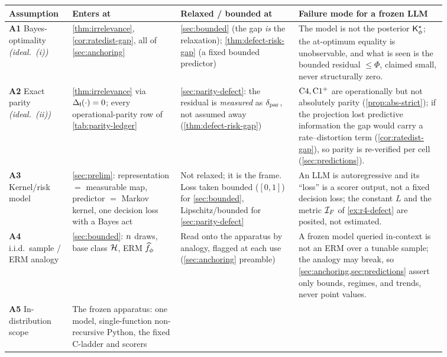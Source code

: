\begin{table}[t]
\centering
\small
\renewcommand{\arraystretch}{1.25}
\begin{tabular}{@{}>{\raggedright\arraybackslash}p{0.10\linewidth}>{\raggedright\arraybackslash}p{0.22\linewidth}>{\raggedright\arraybackslash}p{0.24\linewidth}>{\raggedright\arraybackslash}p{0.30\linewidth}@{}}
\toprule
Assumption & Enters at & Relaxed / bounded at & Failure mode for a frozen LLM \\
\midrule
\textbf{A1} Bayes-optimality \emph{(ideal.~(i))} &
  \cref{thm:irrelevance}, \cref{cor:ratedist-gap}, all of \cref{sec:anchoring} &
  \cref{sec:bounded} (the gap \emph{is} the relaxation); \cref{thm:defect-risk-gap} (a fixed bounded predictor) &
  The model is not the posterior $\mathsf{K}^{\star}_{\phi}$; the at-optimum equality is unobservable, and what is seen is the bounded residual $\le\Phi$, claimed small, never structurally zero. \\
\textbf{A2} Exact parity \emph{(ideal.~(ii))} &
  \cref{thm:irrelevance} via $\Delta_{\mathsf{I}}\!\left(\cdot\right)=0$; every operational-parity row of \cref{tab:parity-ledger} &
  \cref{sec:parity-defect}: the residual is \emph{measured} as $\delta_{\mathrm{par}}$, not assumed away (\cref{thm:defect-risk-gap}) &
  $\mathrm{C}4,\mathrm{C1^{+}}$ are operationally but not absolutely parity (\cref{prop:abs-strict}); if the projection lost predictive information the gap would carry a rate--distortion term (\cref{cor:ratedist-gap}), so parity is re-verified per cell (\cref{sec:predictions}). \\
\textbf{A3} Kernel/risk model &
  \cref{sec:prelim}: representation $=$ measurable map, predictor $=$ Markov kernel, one decision loss with a Bayes act &
  Not relaxed; it is the frame. Loss taken bounded ($[0,1]$) for \cref{sec:bounded}, Lipschitz/bounded for \cref{sec:parity-defect} &
  An LLM is autoregressive and its ``loss'' is a scorer output, not a fixed decision loss; the constant $L$ and the metric $\mathcal{I}_{F}$ of \cref{ex:r4-defect} are posited, not estimated. \\
\textbf{A4} i.i.d.\ sample / ERM analogy &
  \cref{sec:bounded}: $n$ draws, base class $\mathcal{H}$, ERM $\widehat f_{\phi}$ &
  Read onto the apparatus by analogy, flagged at each use (\cref{sec:anchoring} preamble) &
  A frozen model queried in-context is not an ERM over a tunable sample; the analogy may break, so \cref{sec:anchoring,sec:predictions} assert only bounds, regimes, and trends, never point values. \\
\textbf{A5} In-distribution scope &
  The frozen apparatus: one model, single-function non-recursive Python, the fixed C-ladder and scorers &

\end{tabular}
\end{table}
